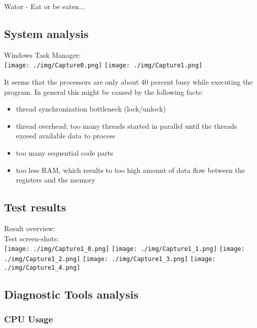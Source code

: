 \begin{section}{Wator - Eat or be eaten...}

    \subsection*{System analysis}
		
		Windows Task Manager:\\
		\texttt{[image: ./img/Capture0.png]}
    \FloatBarrier
		\texttt{[image: ./img/Capture1.png]}
    \FloatBarrier
		
		It seems that the processors are only about 40 percent busy while executing the program.
		In general this might be caused by the following facts:
		    
    \begin{itemize}
    	\item thread synchronization bottleneck (lock/unlock)
			\item thread overhead; too many threads started in parallel until the threads exceed available data to process
			\item too many sequential code parts
			\item too less RAM, which results to too high amount of data flow between the registers and the memory
    \end{itemize}
		
		\subsection*{Test results}
		
		Result overview:\\
		
		
		Test screen-shots:\\
		\texttt{[image: ./img/Capture1\_0.png]}
		\texttt{[image: ./img/Capture1\_1.png]}
		\texttt{[image: ./img/Capture1\_2.png]}
		\texttt{[image: ./img/Capture1\_3.png]}
		\texttt{[image: ./img/Capture1\_4.png]}
    \FloatBarrier
				
		\subsection*{Diagnostic Tools analysis}
		
		\subsubsection*{CPU Usage}
		

\end{section}
